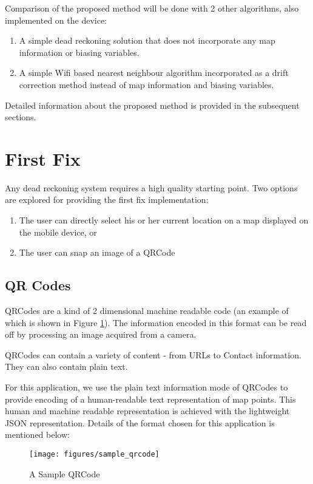 Comparison of the proposed method will be done with 2 other algorithms, also
implemented on the device: 

\begin{enumerate}
\item A simple dead reckoning solution that does not incorporate any map information
    or biasing variables.
\item A simple Wifi based nearest neighbour algorithm incorporated as a 
    drift correction method instead of map information and biasing variables.    
\end{enumerate}

Detailed information about the proposed method is provided in the 
subsequent sections.

\section{First Fix\label{sec:first_fix}}

Any dead reckoning system requires a high quality starting point. Two options
are explored for providing the first fix implementation: 

\begin{enumerate}
\item The user can directly select his or her current location on a map 
    displayed on the mobile device, or
\item The user can snap an image of a QRCode
\end{enumerate}

\subsection{QR Codes\label{sec:QRCodes}}
QRCodes are a kind of 2 dimensional machine readable code (an example of which
is shown in Figure \ref{fig:sample_qrcode}). The information encoded in this
format can be read off by processing an image acquired from a camera. 

QRCodes can contain a variety of content - 
from URLs to Contact information. They can also contain plain text. 

For this application, we use the plain text information mode of QRCodes 
to provide encoding of a human-readable text representation of map points. 
This human and machine readable representation is achieved with the lightweight
JSON representation. Details of the format chosen for this application is
mentioned below:

\begin{figure}
    \centering
    \texttt{[image: figures/sample\_qrcode]}
    \caption{A Sample QRCode\label{fig:sample_qrcode}}
\end{figure}


